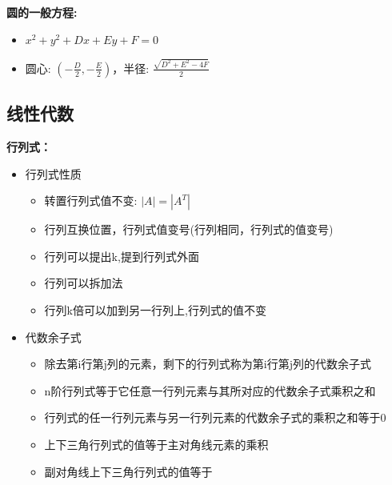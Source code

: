 \documentclass[10pt]{article}
\begin{document}
\begin{multicols}{2}
\textbf{圆的一般方程:}
\begin{itemize}
  \item \(x^2 + y^2 + Dx + Ey + F = 0\)
  \item 圆心: \(\left(-\frac{D}{2}, -\frac{E}{2}\right)\)，半径: \(\frac{\sqrt{D^2 + E^2 - 4F}}{2}\)
\end{itemize}

\end{multicols}

\newpage
\begin{multicols}{2}
\raggedcolumns


\section*{线性代数}

\textbf{行列式：}
\begin{itemize}
  \item 行列式性质
    \begin{itemize}
      \item 转置行列式值不变: \(|A| = |A^T|\)
      \item 行列互换位置，行列式值变号(行列相同，行列式的值变号)
      \item 行列可以提出k,提到行列式外面
      \item 行列可以拆加法
      \item 行列k倍可以加到另一行列上,行列式的值不变
    \end{itemize}
  \item 代数余子式
    \begin{itemize}
      \item 除去第i行第j列的元素，剩下的行列式称为第i行第j列的代数余子式
      \item n阶行列式等于它任意一行列元素与其所对应的代数余子式乘积之和
      \item 行列式的任一行列元素与另一行列元素的代数余子式的乘积之和等于0
      \item 上下三角行列式的值等于主对角线元素的乘积
      \item 副对角线上下三角行列式的值等于
      

\end{itemize}
\end{itemize}
\end{multicols}
\end{document}
